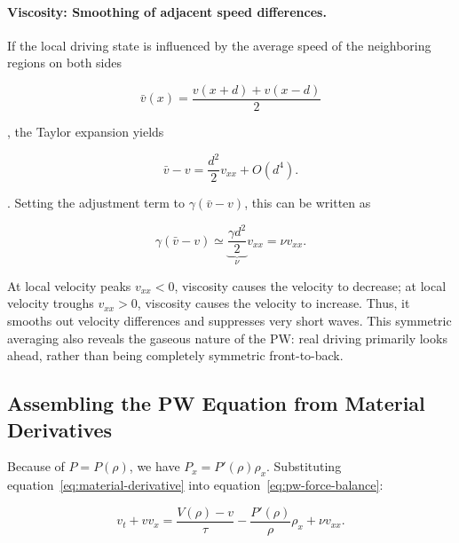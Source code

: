 \documentclass[11pt,a4paper,openany]{book}
\numberwithin{equation}{chapter}
\numberwithin{figure}{chapter}
\numberwithin{table}{chapter}
\begin{document}
\paragraph{Viscosity: Smoothing of adjacent speed differences.}


If the local driving state is influenced by the average speed of the neighboring regions on both sides

\begin{equation}
\bar v(x)=\frac{v(x+d)+v(x-d)}{2}
\end{equation}

, the Taylor expansion yields

\begin{equation}
\bar v-v
=\frac{d^2}{2}v_{xx}+O(d^4).
\end{equation}

. Setting the adjustment term to $\gamma(\bar v-v)$, this can be written as

\begin{equation}
\gamma(\bar v-v)\simeq
\underbrace{\frac{\gamma d^2}{2}}_{\nu}v_{xx}
=\nu v_{xx}.
\label{eq:pw-viscosity-average}
\end{equation}

At local velocity peaks $v_{xx}<0$, viscosity causes the velocity to decrease; at local velocity troughs $v_{xx}>0$, viscosity causes the velocity to increase. Thus, it smooths out velocity differences and suppresses very short waves. This symmetric averaging also reveals the gaseous nature of the PW: real driving primarily looks ahead, rather than being completely symmetric front-to-back.










\subsection{Assembling the PW Equation from Material Derivatives}










Because of $P=P(\rho)$, we have $P_x=P'(\rho)\rho_x$. Substituting equation~\eqref{eq:material-derivative} into equation~\eqref{eq:pw-force-balance}:

\begin{equation}
v_t+vv_x
=\frac{V(\rho)-v}{\tau}
-\frac{P'(\rho)}{\rho}\rho_x
+\nu v_{xx}.
\end{equation}
\end{document}
